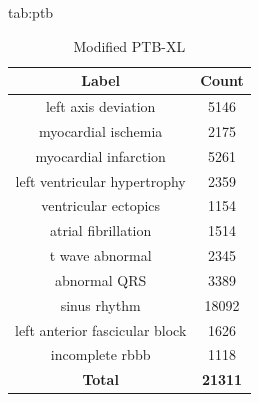 \documentclass[pmlr,twocolumn]{jmlr}%
\begin{document}
\begin{table}[tbp]
\floatconts
  {tab:ptb}%
  {\caption{Modified PTB-XL}}%
  {
    \begin{tabular}{|c|c|}
     \hline
    Label & Count \\
     \hline
        left axis deviation                  &   5146 \\
        myocardial ischemia                  &   2175 \\
        myocardial infarction                &   5261 \\
        left ventricular hypertrophy         &   2359 \\
        ventricular ectopics                 &   1154 \\
        atrial fibrillation                  &   1514 \\
        t wave abnormal                      &   2345 \\
        abnormal QRS                         &   3389 \\
        sinus rhythm                         &  18092 \\
        left anterior fascicular block       &   1626 \\
        incomplete rbbb &   1118 \\
     \hline
    \textbf{Total} & \textbf{21311}\\
    \hline
    \end{tabular}
  }
\end{table}
\end{document}
